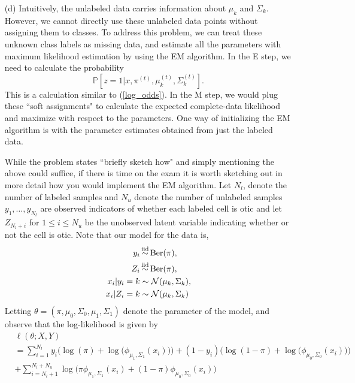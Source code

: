 \begin{itemize}
\item[(d)] Intuitively, the unlabeled data carries information about $\mu_k$ and $\Sigma_k$. However, we cannot directly use these unlabeled data points without assigning them to classes. To address this problem, we can treat these unknown class labels as missing data, and estimate all the parameters with maximum likelihood estimation by using the EM algorithm. In the E step, we need to calculate the probability 
	\begin{equation}
	\mathbb P[z = 1|x, \pi^{(t)}, \mu_k^{(t)}, \Sigma_{k}^{(t)}].
	\end{equation}
	This is a calculation similar to (\ref{log_odds}). In the M step, we would plug these ``soft assignments" to calculate the expected complete-data likelihood and maximize with respect to the parameters. One way of initializing the EM algorithm is with the parameter estimates obtained from just the labeled data. 
	
	
	While the problem states ``briefly sketch how" and simply mentioning the above could suffice, if there is time on the exam it is worth sketching out in more detail how you would implement the EM algorithm. Let $N_l$, denote the number of labeled samples and $N_u$ denote the number of unlabeled samples $y_1,\dots, y_{N_l}$ are observed indicators of whether each labeled cell is otic and let $Z_{N_l+i}$ for $1 \le i \le N_u$ be the unobserved latent variable indicating whether or not the cell is otic. Note that our model for the data is,
\begin{align*}
y_i&\simiid \text{Ber}(\pi), \\
Z_i &\simiid  \text{Ber}(\pi),\\
 x_i|y_i=k &\sim \mathcal N(\mu_k, \Sigma_k), \\ 
 x_i|Z_i=k &\sim \mathcal N(\mu_k, \Sigma_k)
\end{align*}
	Letting $\theta= (\pi, \mu_0,\Sigma_0,\mu_1,\Sigma_1)$ denote the parameter of the model, and observe that the log-likelihood is given by 
$$\begin{aligned}
&\ell(\theta;X,Y) \\
& =\sum_{i=1}^{N_l} y_i \Big( \log(\pi)+ \log \big( \phi_{\mu_1, \Sigma_1}(x_i) \big) \Big)+(1-y_i) \Big( \log(1- \pi) +\log \big( \phi_{\mu_0, \Sigma_0}(x_i) \big) \Big) \\
& +\sum_{i=N_l+1}^{N_l+N_u}   \log \big( \pi \phi_{\mu_1, \Sigma_1}(x_i)  + (1-\pi) \phi_{\mu_0, \Sigma_0}(x_i) \big)
\end{aligned}$$


\end{itemize}
